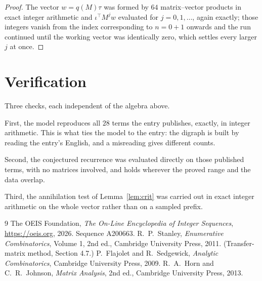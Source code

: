 \documentclass[11pt,a4paper]{article}
\theoremstyle{plain}
\theoremstyle{definition}
\begin{document}
\begin{proof}
The vector $w=q(M)\tau$ was formed by $64$ matrix--vector products in exact integer
arithmetic and $\iota^{\!\top}M^{j}w$ evaluated for $j=0,1,\dots$, again exactly; those
integers vanish from the index corresponding to $n=0+1$ onwards and the run continued
until the working vector was identically zero, which settles every larger $j$ at once.
\end{proof}

\section{Verification}

Three checks, each independent of the algebra above.

First, the model reproduces all $28$ terms the entry publishes, exactly, in integer
arithmetic. This is what ties the model to the entry: the digraph is built by reading the
entry's English, and a misreading gives different counts.

Second, the conjectured recurrence was evaluated directly on those published terms, with no
matrices involved, and holds wherever the proved range and the data overlap.

Third, the annihilation test of Lemma~\ref{lem:crit} was carried out in exact integer
arithmetic on the whole vector rather than on a sampled prefix.

\begin{thebibliography}{9}
 The OEIS Foundation, \emph{The On-Line Encyclopedia of Integer
Sequences}, \url{https://oeis.org}, 2026. Sequence A200663.
 R.~P.~Stanley, \emph{Enumerative Combinatorics}, Volume 1, 2nd ed.,
Cambridge University Press, 2011. (Transfer-matrix method, Section 4.7.)
 P.~Flajolet and R.~Sedgewick, \emph{Analytic Combinatorics}, Cambridge
University Press, 2009.
 R.~A.~Horn and C.~R.~Johnson, \emph{Matrix Analysis}, 2nd ed., Cambridge
University Press, 2013.
\end{thebibliography}
\end{document}

